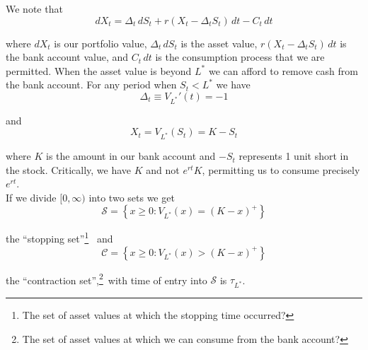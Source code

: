 \documentclass[12pt]{article}
\begin{document}
We note that
\begin{equation*}
	dX_t = \Delta_t\,dS_t + r(X_t - \Delta_t S_t)\,dt - C_t\,dt
\end{equation*}

where $dX_t$ is our portfolio value, $\Delta_t\,dS_t$ is the asset value, $r(X_t - \Delta_t S_t)\,dt$ is the bank account value, and $C_t\,dt$ is the consumption process that we are permitted. When the asset value is beyond $L^*$ we can afford to remove cash from the bank account. For any period when $S_t < L^*$ we have
\begin{equation*}
	\Delta_t \equiv V_{L^*}'(t) = -1
\end{equation*}

and
\begin{equation*}
	X_t = V_{L^*}(S_t) = K - S_t
\end{equation*}

where $K$ is the amount in our bank account and $-S_t$ represents 1 unit short in the stock. Critically, we have $K$ and not $e^{rt}K$, permitting us to consume precisely $e^{rt}$. \\

If we divide $[0, \infty)$ into two sets we get
\begin{equation*}
	\mathcal S = \left\{ x \geq 0: V_{L^*}(x) = (K - x)^+ \right\}
\end{equation*}

the ``stopping set''\footnote{The set of asset values at which the stopping time occurred?}~ and
\begin{equation*}
	\mathcal C = \left\{ x \geq 0: V_{L^*}(x) > (K - x)^+ \right\}
\end{equation*}

the ``contraction set'',\footnote{The set of asset values at which we can consume from the bank account?}~with time of entry into $\mathcal S$ is $\tau_{L^*}$.
\end{document}
